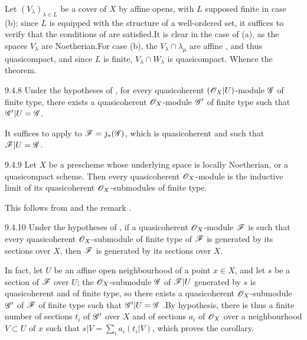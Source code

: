 \documentclass{book}
\begin{document}
Let $(V_\lambda)_{\lambda\in L}$ be a cover of $X$ by affine opens,
with $L$ supposed finite in case (b); since $L$ is equipped with the
structure of a well-ordered set, it suffices to verify that the conditions of
 are satisfied.It is clear in the case of (a), as the spaces
$V_\lambda$ are Noetherian.For case (b), the $V_\lambda\cap\lambda_\mu$
are affine , and thus quasicompact, and since $L$ is finite,
$V_\lambda\cap W_\lambda$ is quasicompact. Whence the theorem.

\begin{envs}[Corollary]{9.4.8}
\label{cor-1.9.4.8}
Under the hypotheses of , for every quasicoherent $(\mathscr{O}_X|U)$-module
$\mathscr{G}$ of finite type, there exists a quasicoherent $\mathscr{O}_X$-module $\mathscr{G}'$
of finite type such that $\mathscr{G}'|U=\mathscr{G}$.
\end{envs}

It suffices to apply  to $\mathscr{F}=j_\ast(\mathscr{G})$, which is
quasicoherent  and such that $\mathscr{F}|U=\mathscr{G}$.

\begin{envs}[Corollary]{9.4.9}
\label{cor-1.9.4.9}
Let $X$ be a prescheme whose underlying space is locally Noetherian, or a
quasicompact scheme. Then every quasicoherent $\mathscr{O}_X$-module is the inductive limit
of its quasicoherent $\mathscr{O}_X$-submodules of finite type.
\end{envs}

This follows from  and the remark .

\begin{envs}[Corollary]{9.4.10}
\label{cor-1.9.4.10}
Under the hypotheses of , if a quasicoherent $\mathscr{O}_X$-module $\mathscr{F}$
is such that every quasicoherent $\mathscr{O}_X$-submodule of finite type of $\mathscr{F}$ is
generated by its sections over $X$, then $\mathscr{F}$ is generated by its sections
over $X$.
\end{envs}

In fact, let $U$ be an affine open neighbourhood of a point $x\in X$, and let
$s$ be a section of $\mathscr{F}$ over $U$; the $\mathscr{O}_X$-submodule $\mathscr{G}$ of
$\mathscr{F}|U$ generated by $s$ is quasicoherent and of finite type, so there
exists a quasicoherent $\mathscr{O}_X$-submodule $\mathscr{G}'$ of $\mathscr{F}$ of finite
type such that $\mathscr{G}'|U=\mathscr{G}$ .By hypothesis, there is thus a
finite number of sections $t_i$ of $\mathscr{G}'$ over $X$ and of sections $a_i$
of $\mathscr{O}_X$ over a neighbourhood $V\subset U$ of $x$ such that
$s|V=\sum_i a_i(t_i|V)$, which proves the corollary.
\end{document}
